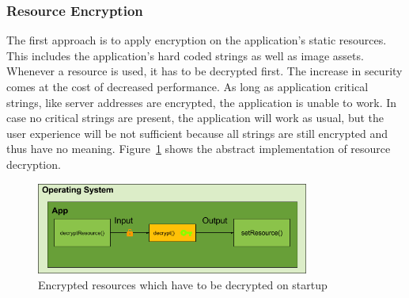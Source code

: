 \subsubsection{Resource Encryption} \label{subsection:counter-replace-encryption-content-resource}
The first approach is to apply encryption on the application's static resources.
This includes the application's hard coded strings as well as image assets.
Whenever a resource is used, it has to be decrypted first.
The increase in security comes at the cost of decreased performance.
As long as application critical strings, like server addresses are encrypted, the application is unable to work.
In case no critical strings are present, the application will work as usual, but the user experience will be not sufficient because all strings are still encrypted and thus have no meaning.
Figure~\ref{fig:encryptionResource} shows the abstract implementation of resource decryption.
\begin{figure}[h]
    \centering
    \includegraphics[width=0.8\textwidth]{data/encryptionResource.png}
    \caption{Encrypted resources which have to be decrypted on startup}
    \label{fig:encryptionResource}
\end{figure}
